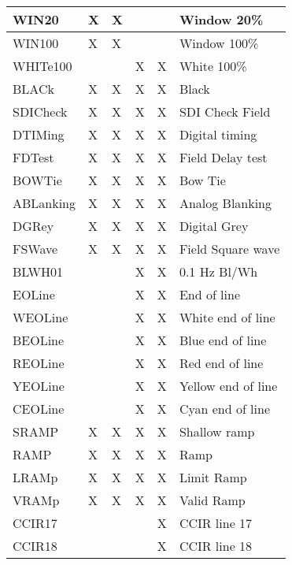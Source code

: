 \begin{center}
\begin{tabular}{|l|l|l|l|l|l|}
WIN20											& X					& X						&						&						& Window 20\%\\ \hline
WIN100										& X					& X						&						&						& Window 100\%\\ \hline
WHITe100									&  					&  						&	X					&	X					& White 100\%\\ \hline
BLACk											& X					& X						& X					& X					& Black\\ \hline
SDICheck									& X					& X						& X					& X					& SDI Check Field\\ \hline
DTIMing										& X					& X						& X					& X					& Digital timing\\ \hline
FDTest										& X					& X						& X					& X					& Field Delay test\\ \hline
BOWTie										& X					& X						& X					& X					& Bow Tie\\ \hline
ABLanking									& X					& X						& X					& X					& Analog Blanking\\ \hline
DGRey											& X					& X						& X					& X					& Digital Grey\\ \hline
FSWave										& X					& X						& X					& X					& Field Square wave\\ \hline
BLWH01										&						&							& X					& X					& 0.1 Hz Bl/Wh\\ \hline
EOLine										&						&							& X					& X					& End of line\\ \hline
WEOLine 									&						&							& X					& X					& White end of line\\ \hline
BEOLine										&						&							& X					& X					& Blue end of line\\ \hline
REOLine										&						&							& X					& X					& Red end of line\\ \hline
YEOLine										&						&							& X					& X					& Yellow end of line\\ \hline
CEOLine										&						&							& X					& X					& Cyan end of line\\ \hline
SRAMP											& X					& X						& X					& X					& Shallow ramp\\ \hline
RAMP											& X					& X						& X					& X					& Ramp\\ \hline
LRAMp											& X					& X						& X					& X					& Limit Ramp\\ \hline
VRAMp											& X					& X						& X					& X					& Valid Ramp\\ \hline
CCIR17										&						&							&						& X					& CCIR line 17\\ \hline
CCIR18										&						&							&						& X					& CCIR line 18\\ \hline

\end{tabular}
\end{center}
